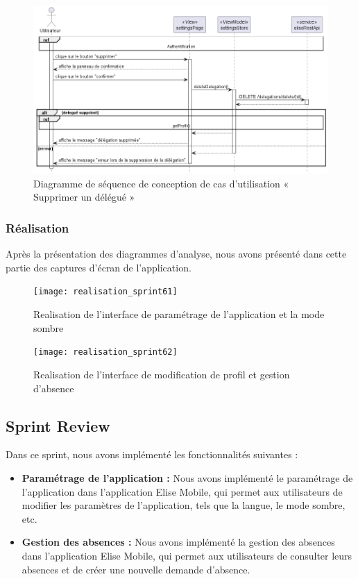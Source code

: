 \begin{figure}[H]
  \centering
  \includegraphics[width=1\textwidth]{out/diagrams/sprint6/sequence_annulation_delegation/sequence_annulation_delegation}
  \caption{Diagramme de séquence de conception de cas d'utilisation « Supprimer un délégué »}
  \label{fig:conception_sequence_annulation_delegation}
\end{figure}




\subsubsection{Réalisation}

Après la présentation des diagrammes d'analyse, nous avons présenté dans cette partie des captures d'écran de l'application.
\begin{figure}[H]
  \centering
  \texttt{[image: realisation\_sprint61]}
  \caption{Realisation de l'interface de paramétrage de l'application et la mode sombre}
  \label{fig:RealisationInterfaceParametrage}
\end{figure}

\begin{figure}[H]
  \centering
  \texttt{[image: realisation\_sprint62]}
  \caption{Realisation de l'interface de modification de profil et gestion d'absence}
  \label{fig:RealisationInterfaceModificationProfil}
\end{figure}

\subsection{Sprint Review}
Dans ce sprint, nous avons implémenté les fonctionnalités suivantes :
\begin{itemize}
  \item \textbf{Paramétrage de l'application :} Nous avons implémenté le paramétrage de l'application dans l'application Elise Mobile, qui permet aux utilisateurs de modifier les paramètres de l'application, tels que la langue, le mode sombre, etc.\\
  \item \textbf{Gestion des absences :} Nous avons implémenté la gestion des absences dans l'application Elise Mobile, qui permet aux utilisateurs de consulter leurs absences et de créer une nouvelle demande d'absence.\\
\end{itemize}
